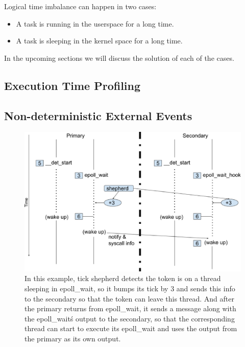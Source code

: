 Logical time imbalance can happen in two cases:
\begin{itemize}
  \item A task is running in the userspace for a long time.
  \item A task is sleeping in the kernel space for a long time.
\end{itemize}

In the upcoming sections we will discuss the solution of each of the cases.
\subsection{Execution Time Profiling}
\subsection{Non-deterministic External Events}
\begin{figure}[ht]
\centering
\includegraphics[width=1.5\columnwidth]{figures/tickbump}
\caption{ In this example, tick shepherd detects the token is on a thread sleeping in epoll\_wait, so it bumps its tick by 3 and sends this info to the secondary so that the token can leave this thread. And after the primary returns from epoll\_wait, it sends a message along with the epoll\_wait\'s output to the secondary, so that the corresponding thread can start to execute its epoll\_wait and uses the output from the primary as its own output. }
\label{f:tick_bump}
\end{figure}

